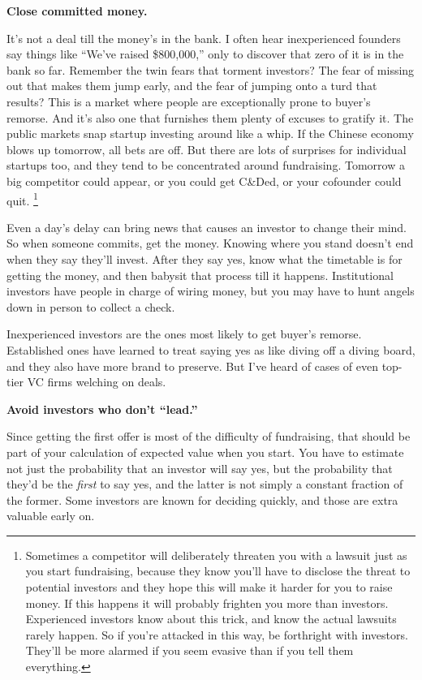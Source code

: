 \documentclass[12pt]{book}
\begin{document}
\textbf{Close committed money.}

It's not a deal till the money's in the bank. I often hear inexperienced
founders say things like ``We've raised \$800,000,'' only to discover
that zero of it is in the bank so far. Remember the twin fears that
torment investors? The fear of missing out that makes them jump early,
and the fear of jumping onto a turd that results? This is a market where
people are exceptionally prone to buyer's remorse. And it's also one
that furnishes them plenty of excuses to gratify it. The public markets
snap startup investing around like a whip. If the Chinese economy blows
up tomorrow, all bets are off. But there are lots of surprises for
individual startups too, and they tend to be concentrated around
fundraising. Tomorrow a big competitor could appear, or you could get
C\&Ded, or your cofounder could quit. \footnote{Sometimes a competitor will deliberately threaten you with a
lawsuit just as you start fundraising, because they know you'll have to
disclose the threat to potential investors and they hope this will make
it harder for you to raise money. If this happens it will probably
frighten you more than investors. Experienced investors know about this
trick, and know the actual lawsuits rarely happen. So if you're attacked
in this way, be forthright with investors. They'll be more alarmed if
you seem evasive than if you tell them everything.}

Even a day's delay can bring news that causes an investor to change
their mind. So when someone commits, get the money. Knowing where you
stand doesn't end when they say they'll invest. After they say yes, know
what the timetable is for getting the money, and then babysit that
process till it happens. Institutional investors have people in charge
of wiring money, but you may have to hunt angels down in person to
collect a check.

Inexperienced investors are the ones most likely to get buyer's remorse.
Established ones have learned to treat saying yes as like diving off a
diving board, and they also have more brand to preserve. But I've heard
of cases of even top-tier VC firms welching on deals.

\textbf{Avoid investors who don't ``lead.''}

Since getting the first offer is most of the difficulty of fundraising,
that should be part of your calculation of expected value when you
start. You have to estimate not just the probability that an investor
will say yes, but the probability that they'd be the \emph{first} to say
yes, and the latter is not simply a constant fraction of the former.
Some investors are known for deciding quickly, and those are extra
valuable early on.
\end{document}
